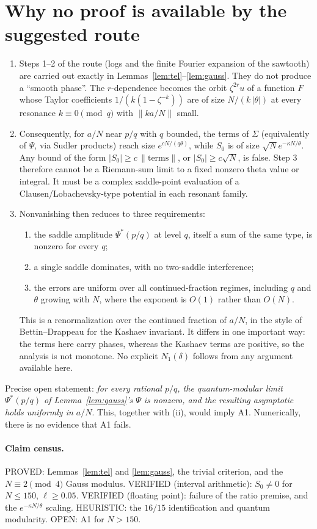 \documentclass[11pt]{article}
\theoremstyle{remark}\newtheorem{remark}[lemma]{Remark}
\begin{document}
\section{Why no proof is available by the suggested route}\label{sec:obst}
\begin{enumerate}
\item Steps 1--2 of the route (logs and the finite Fourier expansion of the sawtooth) are carried out exactly in Lemmas~\ref{lem:tel}--\ref{lem:gauss}. They do not produce a ``smooth phase''. The $r$-dependence becomes the orbit $\zeta^{2r}u$ of a function $F$ whose Taylor coefficients $1/(k(1-\zeta^{-k}))$ are of size $N/(k\,|\theta|)$ at every resonance $k\equiv0\pmod q$ with $\|ka/N\|$ small.
\item Consequently, for $a/N$ near $p/q$ with $q$ bounded, the terms of $\Sigma$ (equivalently of $\Psi$, via Sudler products) reach size $e^{cN/(q\theta)}$, while $S_0$ is of size $\sqrt N e^{-\kappa N/\theta}$. Any bound of the form $|S_0|\ge c\,\|\text{terms}\|$, or $|S_0|\ge c\sqrt N$, is false. Step 3 therefore cannot be a Riemann-sum limit to a fixed nonzero theta value or integral. It must be a complex saddle-point evaluation of a Clausen/Lobachevsky-type potential in each resonant family.
\item Nonvanishing then reduces to three requirements:
 \begin{enumerate}
 \item the saddle amplitude $\Psi^*(p/q)$ at level $q$, itself a sum of the same type, is nonzero for every $q$;
 \item a single saddle dominates, with no two-saddle interference;
 \item the errors are uniform over all continued-fraction regimes, including $q$ and $\theta$ growing with $N$, where the exponent is $O(1)$ rather than $O(N)$.
 \end{enumerate}
 This is a renormalization over the continued fraction of $a/N$, in the style of Bettin--Drappeau for the Kashaev invariant. It differs in one important way: the terms here carry phases, whereas the Kashaev terms are positive, so the analysis is not monotone. No explicit $N_1(\delta)$ follows from any argument available here.
\end{enumerate}
Precise open statement: \emph{for every rational $p/q$, the quantum-modular limit $\Psi^*(p/q)$ of Lemma~\ref{lem:gauss}'s $\Psi$ is nonzero, and the resulting asymptotic holds uniformly in $a/N$}. This, together with (ii), would imply A1. Numerically, there is no evidence that A1 fails.

\paragraph{Claim census.} PROVED: Lemmas~\ref{lem:tel} and \ref{lem:gauss}, the trivial criterion, and the $N\equiv2\pmod4$ Gauss modulus. VERIFIED (interval arithmetic): $S_0\ne0$ for $N\le150$, $\ell\ge0.05$. VERIFIED (floating point): failure of the ratio premise, and the $e^{-\kappa N/\theta}$ scaling. HEURISTIC: the $16/15$ identification and quantum modularity. OPEN: A1 for $N>150$.
\end{document}
